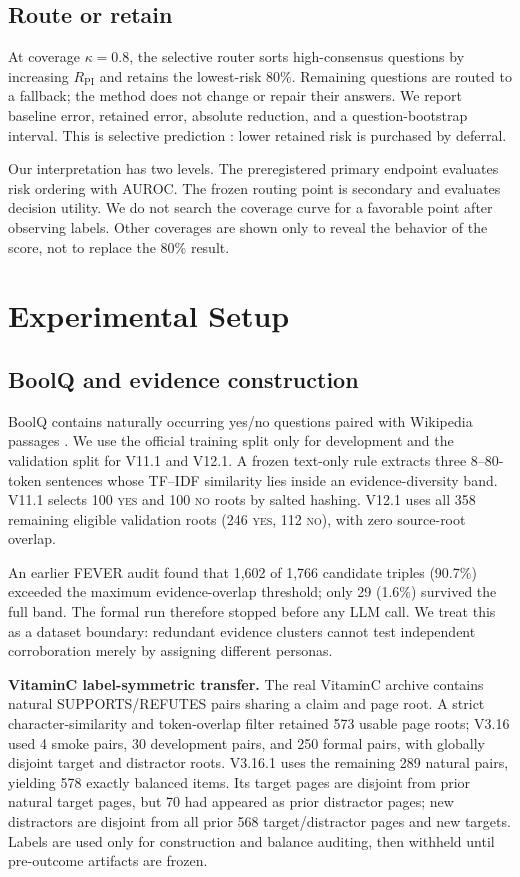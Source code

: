 \documentclass[11pt]{article}
\newcommand{\rpi}{R_{\mathrm{PI}}}
\newcommand{\yes}{\textsc{yes}}
\newcommand{\no}{\textsc{no}}
\begin{document}
\subsection{Route or retain}

At coverage $\kappa=0.8$, the selective router sorts high-consensus questions by increasing $\rpi$ and retains the lowest-risk 80\%. Remaining questions are routed to a fallback; the method does not change or repair their answers. We report baseline error, retained error, absolute reduction, and a question-bootstrap interval. This is selective prediction \citep{geifman2017selective}: lower retained risk is purchased by deferral.

Our interpretation has two levels. The preregistered primary endpoint evaluates risk ordering with AUROC. The frozen routing point is secondary and evaluates decision utility. We do not search the coverage curve for a favorable point after observing labels. Other coverages are shown only to reveal the behavior of the score, not to replace the 80\% result.

\section{Experimental Setup}

\subsection{BoolQ and evidence construction}

BoolQ contains naturally occurring yes/no questions paired with Wikipedia passages \citep{clark2019boolq}. We use the official training split only for development and the validation split for V11.1 and V12.1. A frozen text-only rule extracts three 8--80-token sentences whose TF--IDF similarity lies inside an evidence-diversity band. V11.1 selects 100 \yes{} and 100 \no{} roots by salted hashing. V12.1 uses all 358 remaining eligible validation roots (246 \yes{}, 112 \no{}), with zero source-root overlap.

An earlier FEVER audit found that 1,602 of 1,766 candidate triples (90.7\%) exceeded the maximum evidence-overlap threshold; only 29 (1.6\%) survived the full band. The formal run therefore stopped before any LLM call. We treat this as a dataset boundary: redundant evidence clusters cannot test independent corroboration merely by assigning different personas.

\textbf{VitaminC label-symmetric transfer.} The real VitaminC archive contains natural SUPPORTS/REFUTES pairs sharing a claim and page root. A strict character-similarity and token-overlap filter retained 573 usable page roots; V3.16 used 4 smoke pairs, 30 development pairs, and 250 formal pairs, with globally disjoint target and distractor roots. V3.16.1 uses the remaining 289 natural pairs, yielding 578 exactly balanced items. Its target pages are disjoint from prior natural target pages, but 70 had appeared as prior distractor pages; new distractors are disjoint from all prior 568 target/distractor pages and new targets. Labels are used only for construction and balance auditing, then withheld until pre-outcome artifacts are frozen.
\end{document}
